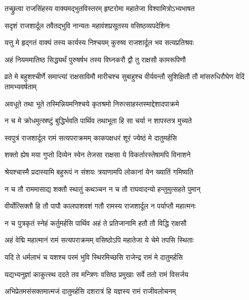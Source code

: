 \twolineshloka
{तच्छ्रुत्वा राजसिंहस्य वाक्यमद्भुतविस्तरम्}
{हृष्टरोमा महातेजा विश्वामित्रोऽभ्यभाषत} %

\twolineshloka
{सदृशं राजशार्दूल तवैतद्भुवि नान्यतः}
{महावंशप्रसूतस्य वसिष्ठव्यपदेशिनः} %

\twolineshloka
{यत्तु मे हृद्गतं वाक्यं तस्य कार्यस्य निश्चयम्}
{कुरुष्व राजशार्दूल भव सत्यप्रतिश्रवः} %

\twolineshloka
{अहं नियममातिष्ठ सिद्ध्यर्थं पुरुषर्षभ}
{तस्य विघ्नकरौ द्वौ तु राक्षसौ कामरूपिणौ} %

\threelineshloka
{व्रते मे बहुशश्चीर्णे समाप्त्यां राक्षसाविमौ}
{मारीचश्च सुबाहुश्च वीर्यवन्तौ सुशिक्षितौ}
{तौ मांसरुधिरौघेण वेदिं तामभ्यवर्षताम्} %

\twolineshloka
{अवधूते तथा भूते तस्मिन्नियमनिश्चये}
{कृतश्रमो निरुत्साहस्तस्माद्देशादपाक्रमे} %

\twolineshloka
{न च मे क्रोधमुत्स्रष्टुं बुद्धिर्भवति पार्थिव}
{तथाभूता हि सा चर्या न शापस्तत्र मुच्यते} %

\twolineshloka
{स्वपुत्रं राजशार्दूल रामं सत्यपराक्रमम्}
{काकपक्षधरं शूरं ज्येष्ठं मे दातुमर्हसि} %

\twolineshloka
{शक्तो ह्येष मया गुप्तो दिव्येन स्वेन तेजसा}
{राक्षसा ये विकर्तारस्तेषामपि विनाशने} %

\twolineshloka
{श्रेयश्चास्मै प्रदास्यामि बहुरूपं न संशयः}
{त्रयाणामपि लोकानां येन ख्यातिं गमिष्यति} %

\twolineshloka
{न च तौ राममासाद्य शक्तौ स्थातुं कथञ्चन}
{न च तौ राघवादन्यो हन्तुमुत्सहते पुमान्} %

\twolineshloka
{वीर्योत्सिक्तौ हि तौ पापौ कालपाशवशं गतौ}
{रामस्य राजशार्दूल न पर्याप्तौ महात्मनः} %

\twolineshloka
{न च पुत्रकृतं स्नेहं कर्तुमर्हसि पार्थिव}
{अहं ते प्रतिजानामि हतौ तौ विद्धि राक्षसौ} %

\twolineshloka
{अहं वेद्मि महात्मानं रामं सत्यपराक्रमम्}
{वसिष्ठोऽपि महातेजा ये चेमे तपसि स्थिताः} %

\twolineshloka
{यदि ते धर्मलाभं च यशश्च परमं भुवि}
{स्थिरमिच्छसि राजेन्द्र रामं मे दातुमर्हसि} %

\twolineshloka
{यद्यभ्यनुज्ञां काकुत्स्थ ददते तव मन्त्रिणः}
{वसिष्ठ प्रमुखाः सर्वे ततो रामं विसर्जय} %

\twolineshloka
{अभिप्रेतमसंसक्तमात्मजं दातुमर्हसि}
{दशरात्रं हि यज्ञस्य रामं राजीवलोचनम्} %

